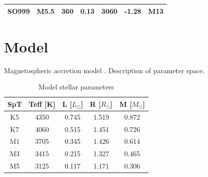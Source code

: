 \documentclass[twocolumn,linenumbers]{aastex631}
\begin{document}
\begin{table}[]
\begin{tabular}{ccccccc}
SO999          & M5.5 & 360          & 0.13          & 3060              & -1.28             & M13  \\ \hline
\end{tabular}

    \label{SP WTTS}
\end{table}
 
\section{Model} \label{Models}

Magnetospheric accretion model \citep{muzerolle2001}. Description of parameter space.

\begin{table}[]
\centering
\caption{Model stellar parameters}
\begin{tabular}{ccccc}
\hline
SpT & Teff {[}K{]} & L {[}$L_{\odot}${]} & R {[}$R_{\odot}${]} & M {[}$M_{\odot}${]} \\ \hline
K5  & 4350         & 0.745               & 1.519               & 0.872               \\
K7  & 4060         & 0.515               & 1.451               & 0.726               \\
M1  & 3705         & 0.345               & 1.426               & 0.614               \\
M3  & 3415         & 0.215               & 1.327               & 0.465               \\
M5  & 3125         & 0.117               & 1.171               & 0.306               \\ \hline
\end{tabular}
\label{table:parametros_modelos}
\end{table}
\end{document}
